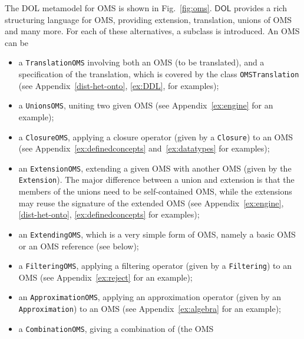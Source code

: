\documentclass[10pt, a4paper]{isov2}
\newcommand*{\syntax}[1]{\texttt{#1}}
\newcommand*{\DOL}{\ensuremath{\mathsf{DOL}}\xspace}
\begin{document}

\label{c:OMS}



The DOL metamodel for OMS is shown in Fig.~\ref{fig:oms}.
\DOL provides a rich structuring language for OMS, providing
extension, translation, unions of OMS and many more.  For each of
these alternatives, a subclass is introduced. An OMS can be
\begin{itemize}
\item a \syntax{TranslationOMS} involving both
an OMS (to be translated), and a specification of the translation,
which is covered by the class \syntax{OMSTranslation}
(see Appendix~\ref{dist-het-onto}, \ref{ex:DDL}, for examples);
\item a \syntax{UnionsOMS}, uniting two given OMS 
(see Appendix~\ref{ex:engine} for an example);
\item a \syntax{ClosureOMS}, applying a closure operator
(given by a \syntax{Closure}) to an OMS (see Appendix~\ref{ex:definedconcepts} and~\ref{ex:datatypes} for examples); 
\item an \syntax{ExtensionOMS}, extending a given OMS with another OMS
  (given by the \syntax{Extension}). The major difference between a
  union and extension is that the members of the unions need to be
  self-contained OMS, while the extensions may reuse the signature of
  the extended OMS
  (see Appendix~\ref{ex:engine}, \ref{dist-het-onto}, \ref{ex:definedconcepts} for examples);
\item an \syntax{ExtendingOMS}, which is a very simple form of OMS,
namely a basic OMS or an OMS reference (see below);
\item a \syntax{FilteringOMS}, applying a filtering operator
(given by a \syntax{Filtering}) to an OMS
  (see Appendix~\ref{ex:reject} for an example);
\item an \syntax{ApproximationOMS}, applying an approximation operator
(given by an \syntax{Approximation}) to an OMS (see Appendix~\ref{ex:algebra} for an example);
\item a \syntax{CombinationOMS}, giving a combination of (the OMS

\end{itemize}
\end{document}
